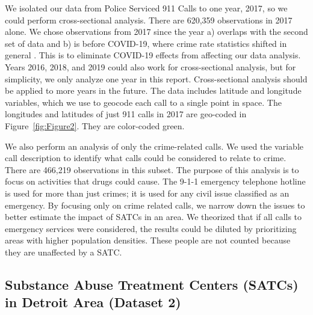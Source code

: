 \documentclass[12pt]{article}
\begin{document}
We isolated our data from Police Serviced 911 Calls to one year, 2017, so we could perform cross-sectional analysis. There are 620,359 observations in 2017 alone. We chose observations from 2017 since the year a) overlaps with the second set of data and b) is before COVID-19, where crime rate statistics shifted in general \citealp{covid_and_crime}. This is to eliminate COVID-19 effects from affecting our data analysis. Years 2016, 2018, and 2019 could also work for cross-sectional analysis, but for simplicity, we only analyze one year in this report. Cross-sectional analysis should be applied to more years in the future. The data includes latitude and longitude variables, which we use to geocode each call to a single point in space. The longitudes and latitudes of just 911 calls in 2017 are geo-coded in Figure~\ref{fig:Figure2}. They are color-coded green. 

We also perform an analysis of only the crime-related calls. We used the variable call description to identify what calls could be considered to relate to crime. There are 466,219 observations in this subset. The purpose of this analysis is to focus on activities that drugs could cause. The 9-1-1 emergency telephone hotline is used for more than just crimes; it is used for any civil issue classified as an emergency. By focusing only on crime related calls, we narrow down the issues to better estimate the impact of SATCs in an area. We theorized that if all calls to emergency services were considered, the results could be diluted by prioritizing areas with higher population densities. These people are not counted because they are unaffected by a SATC.

\subsection{Substance Abuse Treatment Centers (SATCs) in Detroit Area (Dataset 2)}
\end{document}
